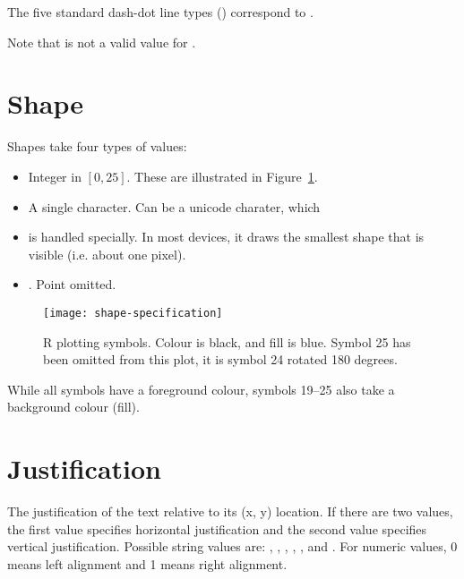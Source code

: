 The five standard dash-dot line types () correspond to .

Note that  is not a valid value for .

\section{Shape}
\label{sec:shape_spec}

Shapes take four types of values:

\begin{itemize}
  \item Integer in $[0, 25]$.  These are illustrated in Figure~\ref{fig:shape}.

  \item A single character.  Can be a unicode charater, which 

  \item {} is handled specially. In most devices, it draws the smallest shape that is visible (i.e. about one pixel).
  
  \item {}.  Point omitted.  
\end{itemize}

\begin{figure}[htbp]
  \centering
    \texttt{[image: shape-specification]}
  \caption{R plotting symbols.  Colour is black, and fill is blue.  Symbol 25 has been omitted from this plot, it is symbol 24 rotated 180 degrees.}
  \label{fig:shape}
\end{figure}

While all symbols have a foreground colour, symbols 19--25 also take a background colour (fill).  


\section{Justification}
\label{sec:justification_spec}

The justification of the text relative to its (x, y) location. If there are two values, the first value specifies horizontal justification and the second value specifies vertical justification. Possible string values are: , , , , , and . For numeric values, 0 means left alignment and 1 means right alignment.


